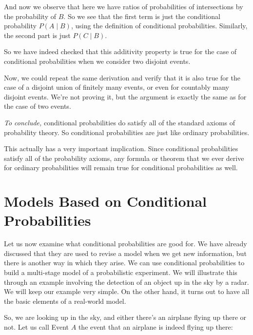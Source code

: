 \documentclass{tufte-handout}
\begin{document}
And now we observe that here we have ratios of probabilities of intersections by the probability of $B$. 
So we see that the first term is just
the conditional probability $P( A \mid B)$, using the definition of conditional probabilities. Similarly, the second
part is just $P( C \mid B)$. 

\vspace{0.2cm}
So we have indeed checked that this additivity property is true for the case of conditional
probabilities when we consider two disjoint events. 
\vspace{0.2cm}

Now, we could repeat the same derivation and verify that it is also true for the case of a disjoint union
of finitely many events, or even for countably many disjoint events. We're not proving it, but the argument 
is exactly the same as for the case of two events.

\vspace{0.2cm}
\textit{To conclude,} conditional probabilities do satisfy all of the standard axioms of probability theory. So conditional
probabilities are just like ordinary probabilities.

\vspace{0.2cm}
This actually has a very important implication. Since conditional probabilities satisfy all of the probability
axioms, any formula or theorem that we ever derive for ordinary probabilities will remain true for
conditional probabilities as well.

\pagebreak

\section{Models Based on Conditional Probabilities}\label{sec:models}

Let us now examine what conditional probabilities are good for. We have already discussed that they
are used to revise a model when we get new information, but there is another way in which they arise.
We can use conditional probabilities to build a multi-stage model of a probabilistic experiment. We will
illustrate this through an example involving the detection of an object up in the sky by a radar. We will
keep our example very simple. On the other hand, it turns out to have all the basic elements of a real-world
model.



So, we are looking up in the sky, and either there's an airplane flying up there or not. Let us call Event $A$
the event that an airplane is indeed flying up there:
\end{document}
